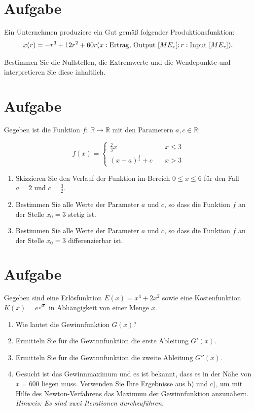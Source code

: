 \documentclass[fontsize=11pt, parskip=half]{scrartcl}
\newcommand{\R}{\mathbb{R}}
\begin{document}
\section{Aufgabe}%

Ein Unternehmen produziere ein Gut gemä{\ss} folgender
Produktionsfunktion:
\[x(r)=-r^3+12r^2+60r\\
(x: \mbox{Ertrag, Output } [ME_x]; r: \mbox{Input } [ME_r]).\]

Bestimmen Sie die Nullstellen, die Extremwerte und die Wendepunkte
und interpretieren Sie diese inhaltlich.



\section{Aufgabe}Gegeben ist die Funktion $f:\ \R \rightarrow \R$ mit den
Parametern $a, c \in \R$:

$$ f(x)=\left\{\begin{array}{ll} \frac{2}{3}x \quad & x\leq 3 \\[0.3cm]
           (x-a)^{\frac{1}{2}}+ c \quad & x > 3 \end{array}\right.$$

\begin{enumerate}
\item Skizzieren Sie den Verlauf der Funktion im Bereich $0 \leq x \leq 6 $ für den Fall $a = 2$ und $c = \frac{3}{2}$.
\item Bestimmen Sie alle Werte der Parameter $a$ und $c$, so dass die
Funktion $f$ an der Stelle $x_0=3$ stetig ist.
\item Bestimmen Sie alle Werte der Parameter $a$ und $c$, so dass die
Funktion $f$ an der Stelle $x_0=3$ differenzierbar ist.
\end{enumerate}



\section{Aufgabe}Gegeben sind eine Erlösfunktion $\displaystyle E(x)=x^4+2x^2$
sowie eine Kostenfunktion $\displaystyle K(x)=e^{\sqrt{x}}$ in
Abhängigkeit von einer Menge $x$.


\begin{enumerate}
 \item Wie lautet die Gewinnfunktion $\displaystyle G(x)$?
 \item Ermitteln Sie für die Gewinnfunktion die erste Ableitung $\displaystyle G'(x)$.
 \item Ermitteln Sie für die Gewinnfunktion die zweite Ableitung $\displaystyle G''(x)$.
 \item Gesucht ist das Gewinnmaximum und es ist bekannt, dass es in der Nähe von $x=600$ liegen muss. Verwenden Sie Ihre Ergebnisse
 aus b) und c), um mit Hilfe des Newton-Verfahrens das Maximum der
 Gewinnfunktion anzunähern.\\
 \emph{Hinweis: Es sind zwei Iterationen durchzuführen.}\\
\end{enumerate}
\end{document}
